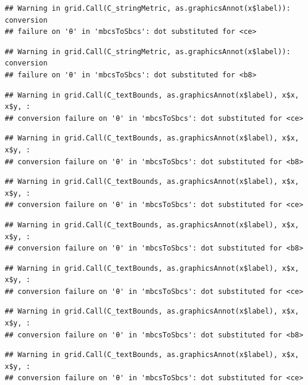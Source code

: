 \documentclass[]{book}
\theoremstyle{definition}
\theoremstyle{definition}
\theoremstyle{definition}
\theoremstyle{remark}
\begin{document}
\begin{verbatim}
## Warning in grid.Call(C_stringMetric, as.graphicsAnnot(x$label)): conversion
## failure on 'θ' in 'mbcsToSbcs': dot substituted for <ce>
\end{verbatim}

\begin{verbatim}
## Warning in grid.Call(C_stringMetric, as.graphicsAnnot(x$label)): conversion
## failure on 'θ' in 'mbcsToSbcs': dot substituted for <b8>
\end{verbatim}

\begin{verbatim}
## Warning in grid.Call(C_textBounds, as.graphicsAnnot(x$label), x$x, x$y, :
## conversion failure on 'θ' in 'mbcsToSbcs': dot substituted for <ce>
\end{verbatim}

\begin{verbatim}
## Warning in grid.Call(C_textBounds, as.graphicsAnnot(x$label), x$x, x$y, :
## conversion failure on 'θ' in 'mbcsToSbcs': dot substituted for <b8>
\end{verbatim}

\begin{verbatim}
## Warning in grid.Call(C_textBounds, as.graphicsAnnot(x$label), x$x, x$y, :
## conversion failure on 'θ' in 'mbcsToSbcs': dot substituted for <ce>
\end{verbatim}

\begin{verbatim}
## Warning in grid.Call(C_textBounds, as.graphicsAnnot(x$label), x$x, x$y, :
## conversion failure on 'θ' in 'mbcsToSbcs': dot substituted for <b8>
\end{verbatim}

\begin{verbatim}
## Warning in grid.Call(C_textBounds, as.graphicsAnnot(x$label), x$x, x$y, :
## conversion failure on 'θ' in 'mbcsToSbcs': dot substituted for <ce>
\end{verbatim}

\begin{verbatim}
## Warning in grid.Call(C_textBounds, as.graphicsAnnot(x$label), x$x, x$y, :
## conversion failure on 'θ' in 'mbcsToSbcs': dot substituted for <b8>
\end{verbatim}

\begin{verbatim}
## Warning in grid.Call(C_textBounds, as.graphicsAnnot(x$label), x$x, x$y, :
## conversion failure on 'θ' in 'mbcsToSbcs': dot substituted for <ce>
\end{verbatim}
\end{document}
